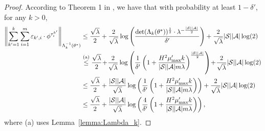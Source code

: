 \begin{proof}
	According to Theorem 1 in \cite{faury2020improved}, we have that with probability at least $1-\delta'$, for any $k>0$,
	\begin{align*}
		\left\| \sum_{k'=1}^{k} \sum_{i=1}^{m} \varepsilon_{k',i} \cdot \phi^{\tau^{k'}_i} \right\|_{\Lambda_{k}^{-1}(\theta^*)} &\leq \frac{\sqrt{\lambda}}{2} + \frac{2}{\sqrt{\lambda}} \log \left(  \frac{\det(\Lambda_{k}(\theta^*))^{\frac{1}{2}} \cdot \lambda^{-\frac{|\mathcal{S}| |\mathcal{A}|}{2}}}{\delta'}   \right) + \frac{2}{\sqrt{\lambda}} |\mathcal{S}| |\mathcal{A}| \log(2)
		\\
		&\overset{\textup{(a)}}{\leq} \frac{\sqrt{\lambda}}{2} \!+\! \frac{2}{\sqrt{\lambda}} \log \left(  \frac{1}{\delta'}  \left(  1 + \frac{H^2 \mu'_{\max} k}{|\mathcal{S}||\mathcal{A}| m \lambda}    \right)^{\frac{|\mathcal{S}||\mathcal{A}|}{2}}   \right)   \!+\! \frac{2}{\sqrt{\lambda}} |\mathcal{S}| |\mathcal{A}| \log(2)
		\\
		&\leq \frac{\sqrt{\lambda}}{2} + \frac{|\mathcal{S}||\mathcal{A}|}{\sqrt{\lambda}} \log \left(  \frac{1}{\delta'}  \left(  1 + \frac{H^2 \mu'_{\max} k}{|\mathcal{S}||\mathcal{A}| m \lambda}    \right)   \right)   + \frac{2}{\sqrt{\lambda}} |\mathcal{S}| |\mathcal{A}| \log(2)
		\\
		&\leq \frac{\sqrt{\lambda}}{2} + \frac{|\mathcal{S}||\mathcal{A}|}{\sqrt{\lambda}} \log \left(  \frac{4}{\delta'}  \left(  1 + \frac{H^2 \mu'_{\max} k}{|\mathcal{S}||\mathcal{A}| m \lambda}    \right)   \right) ,
	\end{align*}
	where (a) uses Lemma~\ref{lemma:Lambda_k}.
\end{proof}

